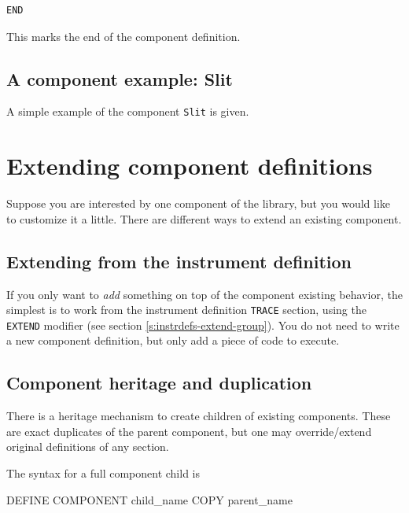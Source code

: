 \begin{lstlisting}
END
\end{lstlisting}
This marks the end of the component definition.

\subsection{A component example: Slit}
\label{s:slit}
A simple example of the component \texttt{Slit} is given.



\section{Extending component definitions}
\label{s:compdefs-extend}

Suppose you are interested by one component of the \MCS library, but you would
like to customize it a little. There are different ways to extend an existing
component.

\subsection{Extending from the instrument definition}

If you only want to \emph{add} something on top of the component existing behavior, the simplest is to work from the instrument definition \texttt{TRACE} section, using the \texttt{EXTEND} modifier (see section \ref{s:instrdefs-extend-group}). You do not need to write a new component definition, but only add a piece of code to execute.

\subsection{Component heritage and duplication}

There is a heritage mechanism to create children of existing components. These
are exact duplicates of the parent component, but one may override/extend
original definitions of any section.

The syntax for a full component child is
\begin{mcstas}
DEFINE COMPONENT child_name COPY parent_name
\end{mcstas}

